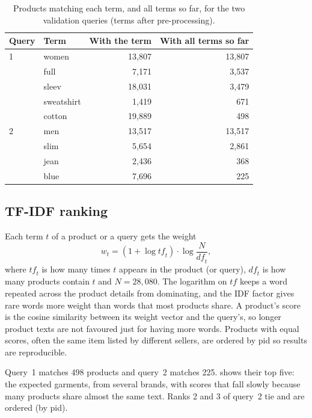 \documentclass[11pt,a4paper]{article}
\begin{document}
\begin{table}[htbp]
  \centering
  \caption{Products matching each term, and all terms so far, for the two
  validation queries (terms after pre-processing).}
  \label{tab:and}
  \begin{tabular}{llrr}
    \toprule
    Query & Term & With the term & With all terms so far \\
    \midrule
    1 & women & 13{,}807 & 13{,}807 \\
      & full & 7{,}171 & 3{,}537 \\
      & sleev & 18{,}031 & 3{,}479 \\
      & sweatshirt & 1{,}419 & 671 \\
      & cotton & 19{,}889 & 498 \\
    \midrule
    2 & men & 13{,}517 & 13{,}517 \\
      & slim & 5{,}654 & 2{,}861 \\
      & jean & 2{,}436 & 368 \\
      & blue & 7{,}696 & 225 \\
    \bottomrule
  \end{tabular}
\end{table}

\subsection{TF-IDF ranking}

Each term $t$ of a product or a query gets the weight
\[
  w_t = \left(1 + \log \mathit{tf}_t\right) \cdot \log \frac{N}{\mathit{df}_t},
\]
where $\mathit{tf}_t$ is how many times $t$ appears in the product (or query),
$\mathit{df}_t$ is how many products contain $t$ and $N = 28{,}080$. The
logarithm on $\mathit{tf}$ keeps a word repeated across the product details
from dominating, and the IDF factor gives rare words more weight than words
that most products share. A product's score is the cosine similarity between
its weight vector and the query's, so longer product texts are not favoured
just for having more words. Products with equal scores, often the same item
listed by different sellers, are ordered by pid so results are reproducible.

Query~1 matches 498 products and query~2 matches 225.  shows
their top five: the expected garments, from several brands, with scores that
fall slowly because many products share almost the same text. Ranks 2 and 3 of
query~2 tie and are ordered (by pid).
\end{document}
